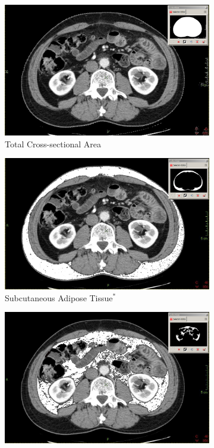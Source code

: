 \begin{figure}[htbp]
	\centering
	\begin{subfigure}{0.45\textwidth}
		\centering
		\includegraphics[width=\textwidth]{Figures/bc_ct_csa}
		\caption{Total Cross-sectional Area}
		\label{fig:bc_ct_csa}
	\end{subfigure}
	\begin{subfigure}{0.45\textwidth}
		\centering
		\includegraphics[width=\textwidth]{Figures/bc_ct_sat}
		\caption{Subcutaneous Adipose Tissue$^*$}
		\label{fig:bc_ct_sat}
	\end{subfigure}
	\hfill
	\begin{subfigure}{0.45\textwidth}
		\centering
		\includegraphics[width=\textwidth]{Figures/bc_ct_vat}

\end{subfigure}
\end{figure}
